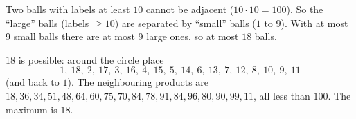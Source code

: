 Two balls with labels at least $10$ cannot be adjacent ($10\cdot10=100$). So the ``large'' balls (labels $\ge10$) are separated by ``small'' balls ($1$ to $9$). With at most $9$ small balls there are at most $9$ large ones, so at most $18$ balls.

$18$ is possible: around the circle place
\[1,\ 18,\ 2,\ 17,\ 3,\ 16,\ 4,\ 15,\ 5,\ 14,\ 6,\ 13,\ 7,\ 12,\ 8,\ 10,\ 9,\ 11\]
(and back to $1$). The neighbouring products are $18,36,34,51,48,64,60,75,70,84,78,91,84,96,80,90,99,11$, all less than $100$. The maximum is $\boxed{18}$.
